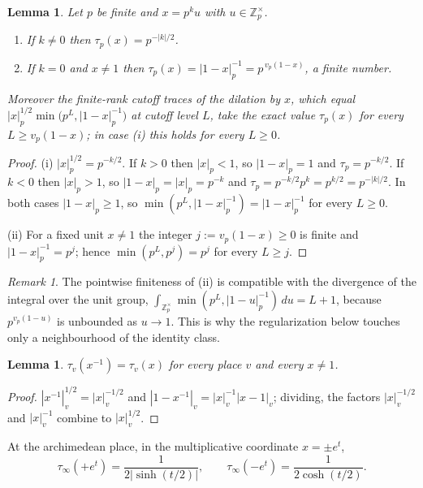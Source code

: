 \documentclass[11pt]{amsart}
\newtheorem{lemma}[theorem]{Lemma}
\theoremstyle{definition}
\theoremstyle{remark}
\newtheorem{remark}[theorem]{Remark}
\newcommand{\Z}{\mathbb Z}
\begin{document}
\begin{lemma}\label{lem:tau}
Let $p$ be finite and $x=p^{k}u$ with $u\in\Z_p^{\times}$.
\begin{enumerate}
\item[(i)] If $k\ne0$ then $\tau_p(x)=p^{-|k|/2}$.
\item[(ii)] If $k=0$ and $x\ne1$ then $\tau_p(x)=|1-x|_p^{-1}=p^{\,v_p(1-x)}$,
a finite number.
\end{enumerate}
Moreover the finite-rank cutoff traces of the dilation by $x$, which equal
$|x|_p^{1/2}\min\bigl(p^{L},|1-x|_p^{-1}\bigr)$ at cutoff level $L$, take the
exact value $\tau_p(x)$ for every $L\ge v_p(1-x)$; in case (i) this holds for
every $L\ge0$.
\end{lemma}

\begin{proof}
(i) $|x|_p^{1/2}=p^{-k/2}$.  If $k>0$ then $|x|_p<1$, so $|1-x|_p=1$ and
$\tau_p=p^{-k/2}$.  If $k<0$ then $|x|_p>1$, so $|1-x|_p=|x|_p=p^{-k}$ and
$\tau_p=p^{-k/2}p^{k}=p^{k/2}=p^{-|k|/2}$.  In both cases $|1-x|_p\ge1$, so
$\min(p^{L},|1-x|_p^{-1})=|1-x|_p^{-1}$ for every $L\ge0$.

(ii) For a fixed unit $x\ne1$ the integer $j:=v_p(1-x)\ge0$ is finite and
$|1-x|_p^{-1}=p^{j}$; hence $\min(p^{L},p^{j})=p^{j}$ for every $L\ge j$.
\end{proof}

\begin{remark}\label{rem:unitdiv}
The pointwise finiteness of (ii) is compatible with the divergence of the
integral over the unit group,
$\int_{\Z_p^{\times}}\min(p^{L},|1-u|_p^{-1})\,du=L+1$, because
$p^{v_p(1-u)}$ is unbounded as $u\to1$.  This is why the regularization below
touches only a neighbourhood of the identity class.
\end{remark}

\begin{lemma}\label{lem:inv}
$\tau_v(x^{-1})=\tau_v(x)$ for every place $v$ and every $x\ne1$.
\end{lemma}

\begin{proof}
$|x^{-1}|_v^{1/2}=|x|_v^{-1/2}$ and
$|1-x^{-1}|_v=|x|_v^{-1}|x-1|_v$; dividing, the factors $|x|_v^{-1/2}$ and
$|x|_v^{-1}$ combine to $|x|_v^{1/2}$.
\end{proof}

At the archimedean place, in the multiplicative coordinate $x=\pm e^{t}$,
\begin{equation}\label{eq:tauinf}
\tau_{\infty}(+e^{t})=\frac{1}{2|\sinh(t/2)|},\qquad
\tau_{\infty}(-e^{t})=\frac{1}{2\cosh(t/2)} .
\end{equation}
\end{document}
